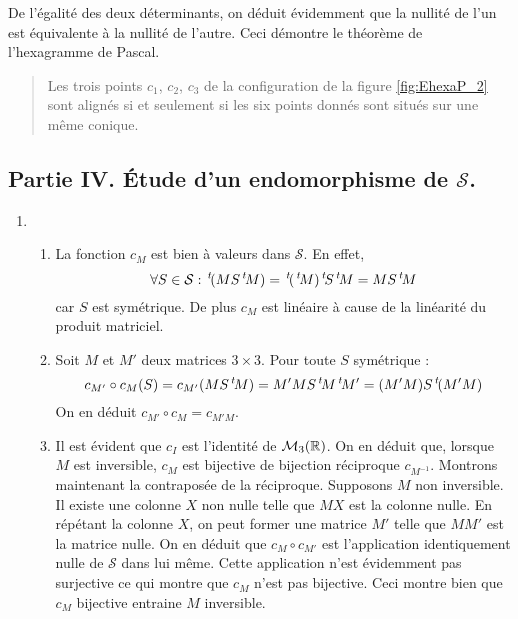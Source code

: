 De l'égalité des deux déterminants, on déduit évidemment que la nullité de l'un est équivalente à la nullité de l'autre. Ceci démontre le théorème de l'hexagramme de Pascal. 
\begin{quote}
 Les trois points $c_1$, $c_2$, $c_3$ de la configuration de la figure \ref{fig:EhexaP_2} sont alignés si et seulement si les six points donnés sont situés sur une même conique.
\end{quote}

\subsection*{Partie IV. \'Etude d'un endomorphisme de $\mathcal S$.}
\begin{enumerate}
 \item \begin{enumerate}
 \item La fonction $c_M$ est bien à valeurs dans $\mathcal S$. En effet, 
\begin{displaymath}
 \forall S\in \mathcal S :
\,\mathstrut^t\!(M S \,\mathstrut^t\! M) = \,\mathstrut^t\!(\,\mathstrut^t\! M) \,\mathstrut^t\! S \,\mathstrut^t\! M = M S \,\mathstrut^t\! M
\end{displaymath}
car $S$ est symétrique. De plus $c_M$ est linéaire à cause de la linéarité du produit matriciel.

\item Soit $M$ et $M'$ deux matrices $3\times 3$. Pour toute $S$ symétrique :
\begin{displaymath}
 c_{M'}\circ c_M(S) = c_{M'}(M S \,\mathstrut^t\! M) = M' M S \,\mathstrut^t\! M \,\mathstrut^t\! M'
= (M' M) S \,\mathstrut^t\! (M' M)
\end{displaymath}
On en déduit $c_{M'}\circ c_M=c_{M'M}$.
\item Il est évident que $c_I$ est l'identité de $\mathcal M_{3}(\mathbb{R})$. On en déduit que, lorsque $M$ est inversible, $c_M$ est bijective de bijection réciproque $c_{M^{-1}}$.\newline
Montrons maintenant la contraposée de la réciproque. Supposons $M$ non inversible. Il existe une colonne $X$ non nulle telle que $MX$ est la colonne nulle. En répétant la colonne $X$, on peut former une matrice $M'$ telle que $MM'$ est la matrice nulle. On en déduit que $c_{M}\circ c_{M'}$ est l'application identiquement nulle de $\mathcal S$ dans lui même. Cette application n'est évidemment pas surjective ce qui montre que $c_M$ n'est pas bijective. Ceci montre bien que $c_M$ bijective entraine $M$ inversible.
\end{enumerate}


\end{enumerate}
